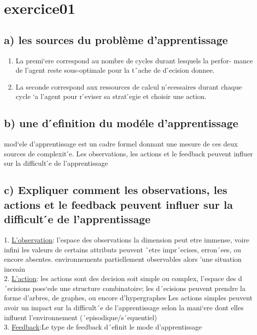 \documentclass{article}
\begin{document}
\section*{exercice01}
    \subsection*{a) les sources du problème d’apprentissage}
    \begin{enumerate}
        \item La premi`ere correspond au nombre de cycles durant lesquels la perfor-
        mance de l’agent reste sous-optimale pour la tˆache de d ́ecision donnee.
        \item La seconde correspond aux ressources de calcul n ́ecessaires durant chaque
        cycle `a l’agent pour r ́eviser sa strat ́egie et choisir une action.



    \end{enumerate}
    \subsection*{b) une d ́efinition du modéle d’apprentissage}
    mod`ele d’apprentissage est un cadre formel donnant une mesure de ces deux
    sources de complexit ́e. Les observations, les actions et le feedback peuvent
    influer sur la difficult ́e de l’apprentissage
    \subsection*{c) Expliquer comment les observations, les actions et le feedback peuvent influer sur la difficult ́e de l’apprentissage}
    1. \underline{L’observation}:  l’espace des observations
    la dimension peut etre immense, voire infini
 les valeurs de certains attributs peuvent ˆetre impr´ecises, erron´ees, ou
encore absentes.
environnements partiellement observables alors ’une situation inceain \\
2. \underline{L’action}: les actions sont des decision soit simple ou complex,
 l’espace des d´ecisions poss`ede une structure combinatoire; les d´ecisions
peuvent prendre la forme d’arbres, de graphes, ou encore d’hypergraphes
Les actions simples peuvent avoir un impact sur la difficult´e de l’apprentissage
selon la mani`ere dont elles influent l’environnement (´episodique/s´equentiel)\\
3. \underline{Feedback}:Le type de feedback d´efinit le mode d’apprentissage
\end{document}
